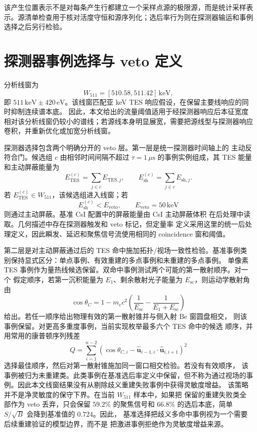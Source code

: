 \documentclass[preprint,12pt]{elsarticle}
\newcommand{\keV}{\,\mathrm{keV}}
\newcommand{\wii}{W_{511}}
\begin{document}
该产生位置表示不是对每条产生行都建立一个采样点源的极限源，而是统计采样表示。源清单检查用于核对活度守恒和源序列化；选后率行为则在探测器输运和事例选择之后另行检验。

\section{探测器事例选择与 veto 定义}
\label{sec:selection}

分析线窗为
\begin{equation}
  \wii = [510.58,511.42]\keV,
\end{equation}
即 $511\keV\pm420\,\mathrm{eV}$。该线窗匹配亚 keV TES 响应假设，在保留主要线响应的同时抑制连续谱本底。
因此，本文给出的流量阈值适用于经探测器响应后本征宽度相对该分析线窗仍较小的谱线；若源线本身明显展宽，需要把源线型与探测器响应卷积，并重新优化或加宽分析线窗。

探测器选择包含两个明确分开的 veto 层。第一层是统一探测器时间轴上的
主动反符合门。候选组 $c$ 由相邻时间间隔不超过
$\tau=1\,\mu\mathrm{s}$ 的事例实例组成，其 TES 能量和主动屏蔽能量为
\begin{equation}
  E_{\mathrm{TES}}^{(c)}=\sum_{j\in c}E_{\mathrm{TES},j},\qquad
  E_{\mathrm{sh}}^{(c)}=\sum_{j\in c}E_{\mathrm{sh},j}.
\end{equation}
若 $E_{\mathrm{TES}}^{(c)}\in\wii$，该候选组进入线窗；若
\begin{equation}
  E_{\mathrm{sh}}^{(c)} < E_{\mathrm{veto}}, \qquad E_{\mathrm{veto}}=50\keV
\end{equation}
则通过主动屏蔽。基准 CsI 配置中的屏蔽能量由 CsI 主动屏蔽体积
在后处理中读取。几何描述中存在探测器触发和 veto 标记，但定量率
定义采用这里的统一后处理定义，因此瞬发、延迟和聚焦信号流使用相同的
coincidence 窗和阈值。

第二层是对主动屏蔽通过后的 TES 命中施加拓扑/视场一致性检验。基准事例类别保持显式区分：单点事例、有效重建的多点事例和未重建的多点事例。
单像素 TES 事例作为量热线候选保留。双命中事例测试两个可能的第一散射顺序。对一个
假定顺序，若第一沉积能量为 $E_1$、剩余散射光子能量为
$E_{\mathrm{sc}}$，则运动学散射角由
\begin{equation}
  \cos\theta_C =
  1 - m_ec^2\left(\frac{1}{E_{\mathrm{sc}}}
  - \frac{1}{E_1+E_{\mathrm{sc}}}\right)
\end{equation}
给出。若任一顺序给出物理有效的第一散射锥并与侧入射 Be 窗圆盘相交，
则该事例保留。对更高多重度事例，当前实现枚举最多六个 TES 命中的候选
顺序，并用常用的康普顿序列残差
\begin{equation}
  Q = \sum_{i=1}^{n-2}
  \left(\cos\theta_{C,i} -
  \hat{\mathbf u}_{i-1,i}\cdot\hat{\mathbf u}_{i,i+1}\right)^2
\end{equation}
选择最佳顺序，然后对第一散射锥施加同一窗口相交检验。若没有有效顺序，
该事例被归为未重建类。此类事例在基准选后率定义中保留，但不称为通过视场的事例。因此本文线窗结果没有从剔除歧义重建失败事例中获得灵敏度增益。
该策略并不是净灵敏度的保守下界。在当前 $\wii$ 样本中，如果把
保留的重建失败类全部作为 veto 丢弃，只会保留 $59.2\%$ 的聚焦信号和
$66.8\%$ 的选后本底，简单 $S/\sqrt{B}$ 会降到基准值的 $0.724$。因此，
基准选择把歧义多命中事例视为一个需要后续重建验证的模型边界，而不是
把激进事例拒绝作为灵敏度增益来源。
\end{document}
